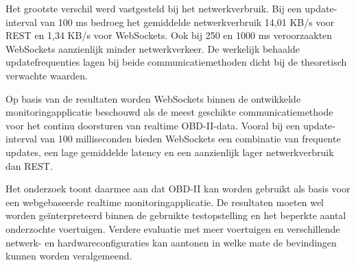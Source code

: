 Het grootste verschil werd vastgesteld bij het netwerkverbruik. Bij een
update-interval van 100 ms bedroeg het gemiddelde netwerkverbruik 14,01 KB/s
voor REST en 1,34 KB/s voor WebSockets. Ook bij 250 en 1000 ms veroorzaakten
WebSockets aanzienlijk minder netwerkverkeer. De werkelijk behaalde
updatefrequenties lagen bij beide communicatiemethoden dicht bij de theoretisch
verwachte waarden.

Op basis van de resultaten worden WebSockets binnen de ontwikkelde
monitoringapplicatie beschouwd als de meest geschikte communicatiemethode voor
het continu doorsturen van realtime OBD-II-data. Vooral bij een
update-interval van 100 milliseconden bieden WebSockets een combinatie van
frequente updates, een lage gemiddelde latency en een aanzienlijk lager
netwerkverbruik dan REST.

Het onderzoek toont daarmee aan dat OBD-II kan worden gebruikt als basis voor
een webgebaseerde realtime monitoringapplicatie. De resultaten moeten wel
worden geïnterpreteerd binnen de gebruikte testopstelling en het beperkte
aantal onderzochte voertuigen. Verdere evaluatie met meer voertuigen en
verschillende netwerk- en hardwareconfiguraties kan aantonen in welke mate de
bevindingen kunnen worden veralgemeend.